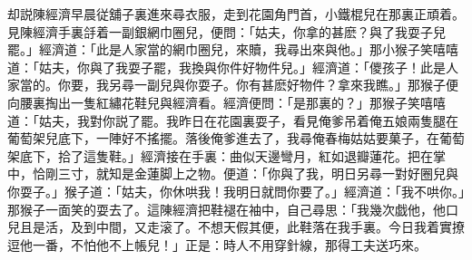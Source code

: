 却説陳經濟早晨従舖子裏進來尋衣服，走到花園角門首，小鐵棍兒在那裏正頑着。見陳經濟手裏㧱着一副銀網巾圈兒，便問：「姑夫，你拿的甚麽？與了我耍子兒罷。」經濟道：「此是人家當的網巾圈兒，來贖，我尋出來與他。」那小猴子笑嘻嘻道：「姑夫，你與了我耍子罷，我換與你件好物件兒。」經濟道：「儍孩子！此是人家當的。你要，我另尋一副兒與你耍子。你有甚麽好物件？拿來我瞧。」那猴子便向腰裏掏出一隻紅繡花鞋兒與經濟看。經濟便問：「是那裏的？」那猴子笑嘻嘻道：「姑夫，我對你説了罷。我昨日在花園裏耍子，看見俺爹吊着俺五娘兩隻腿在葡萄架兒底下，一陣好不搖擺。落後俺爹進去了，我尋俺春梅姑姑要菓子，在葡萄架底下，拾了這隻鞋。」經濟接在手裏：曲似天邊彎月，紅如退瓣蓮花。把在掌中，恰剛三寸，就知是金蓮脚上之物。便道：「你與了我，明日另尋一對好圈兒與你耍子。」猴子道：「姑夫，你休哄我！我明日就問你要了。」經濟道：「我不哄你。」那猴子一面笑的耍去了。這陳經濟把鞋褪在袖中，自己尋思：「我幾次戯他，他口兒且是活，及到中間，又走滚了。不想天假其便，此鞋落在我手裏。今日我着實撩逗他一番，不怕他不上帳兒！」正是：時人不用穿針線，那得工夫送巧來。

